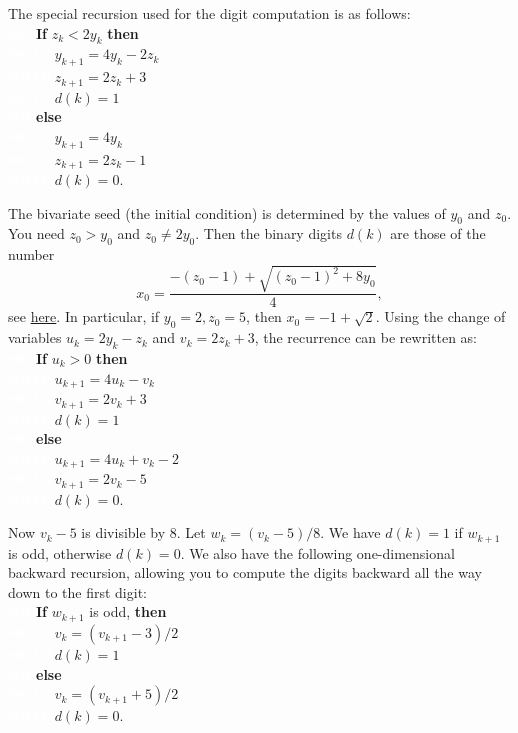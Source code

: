 \documentclass[oneside,10pt]{book}
\begin{document}
\noindent The special recursion used for the digit computation is as follows:  \vspace{1ex} \\
\noindent  \textcolor{white}{0000}{\bf If}  $ z_k  <2y_k$   {\bf then}   \\
  \textcolor{white}{000000}  $y_{k+1}=4y_k-2z_k$\\
 \textcolor{white}{000000} $z_{k+1}=2z_k+3$\\
 \textcolor{white}{000000} $d(k)=1$ \\
\textcolor{white}{0000}{\bf else} \\  
\textcolor{white}{000000} $ y_{k+1}=4y_k$\\
\textcolor{white}{000000} $ z_{k+1}=2z_k-1$\\
\textcolor{white}{000000} $ d(k)=0$. 

\noindent The bivariate seed (the initial condition) is determined by the values of $y_0$ and $z_0$. You need $z_0>y_0$ and $z_0\neq 2y_0$. Then the binary digits $d(k)$ are those of the number 
 $$x_0 = \frac{-(z_0-1) + \sqrt{(z_0-1)^2+8y_0}}{4},$$ 
see \href{https://mltblog.com/3REtOB9}{here}. In particular, if $y_0=2, z_0=5$, then $x_0=-1+\sqrt{2}$. Using the change of variables
  $u_k=2y_k-z_k$ and $v_k = 2z_k+3$, the recurrence can be rewritten as: \vspace{1ex} \\


\noindent  \textcolor{white}{0000}{\bf If}  $ u_k>0$   {\bf then}   \\
  \textcolor{white}{000000} $u_{k+1}=4u_k -v_k$ \\
 \textcolor{white}{000000} $v_{k+1} = 2v_k + 3$\\
 \textcolor{white}{000000} $d(k)=1$\\
\textcolor{white}{0000}{\bf else} \\  
\textcolor{white}{000000} $u_{k+1}=4u_k + v_k-2$\\
\textcolor{white}{000000} $v_{k+1} = 2v_k-5$\\
\textcolor{white}{000000} $ d(k)=0$. 

\noindent Now $v_k-5$ is divisible by $8$. Let $w_k=(v_k-5)/8$. We have $d(k)=1$ if $w_{k+1}$ is odd, otherwise $d(k)=0$. We also have the 
 following one-dimensional backward recursion, allowing you to compute the digits backward all the way down to the first digit:\vspace{1ex} \\
\noindent  \textcolor{white}{0000}{\bf If}  $w_{k+1}$ is odd,  {\bf then}   \\
 \textcolor{white}{000000} $v_{k} = (v_{k+1} -3)/2$\\
\textcolor{white}{000000} $d(k)=1$\\
\textcolor{white}{0000}{\bf else} \\  
\textcolor{white}{000000} $v_{k} = (v_{k+1}+5)/2$\\
\textcolor{white}{000000} $d(k)=0$.
\end{document}
